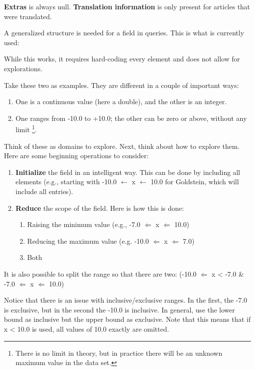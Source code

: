 \textbf{Extras} is always null. \textbf{Translation information} is only present for articles that were translated.
\par A generalized structure is needed for a field in queries. This is what is currently used:
\par While this works, it requires hard-coding every element and does not allow for explorations.
\par Take these two as examples. %
They are different in a couple of important ways: 
\begin{enumerate} 
\item One is a continuous value (here a double), and the other is an integer.
\item One ranges from -10.0 to +10.0; the other can be zero or above, without any limit \footnote{There is no limit in theory, but in practice there will be an unknown maximum value in the data set.}.
\end{enumerate}
\par Think of these as domains to explore. Next, think about how to explore them. Here are some beginning operations to consider:
\begin{enumerate} \item \textbf{Initialize} the field in an intelligent way. This can be done by including all elements (e.g., starting with -10.0 $\leftarrow$ x $\leftarrow$ 10.0 for Goldstein, which will include all entries).
\item \textbf{Reduce} the scope of the field. Here is how this is done:
\begin{enumerate}\item Raising the minimum value (e.g., -7.0 $\Leftarrow$ x $\Leftarrow$ 10.0)
\item Reducing the maximum value (e.g. -10.0 $\Leftarrow$ x $\Leftarrow$ 7.0)
\item Both \end{enumerate}\end{enumerate}

It is also possible to split the range so that there are two: %
(-10.0 $\Leftarrow$ x < -7.0 \& -7.0 $\Leftarrow$ x $\Leftarrow$ 10.0)

Notice that there is an issue with inclusive/exclusive ranges. In the first, the -7.0 is exclusive, but in the second the -10.0 is inclusive. In general, use the lower bound as inclusive but the upper bound as exclusive. Note that this means that if x < 10.0 is used, all values of 10.0 exactly are omitted.


